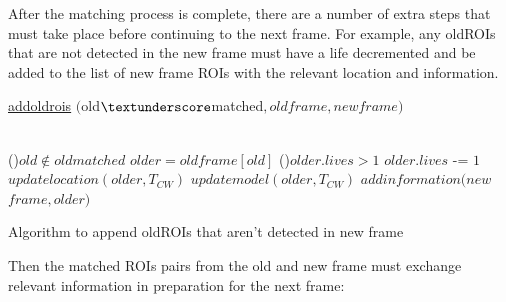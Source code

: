 \documentclass[11pt,twoside]{report}
\begin{document}
After the matching process is complete, there are a number of extra steps that must take place before continuing to the next frame. For example, any oldROIs that are not detected in the new frame must have a life decremented and be added to the list of new frame ROIs with the relevant location and information.

\begin{algorithm}
	\DontPrintSemicolon
	\SetAlgoLined
	\underline{add\textunderscore old\textunderscore rois} $($old$\textunderscore$matched$,old$\textunderscore$frame,new$\textunderscore$frame)$\;
	
	\texttt{\\}
	\ForEach(){$old \notin old$\textunderscore$matched$}{
		$older = old$\textunderscore$frame[old]$ 
		\uIf(){$older.lives > 1$}{
			$older.lives$ -= $1$ 
			$update$\textunderscore$location(older,T_{CW})$  
			$update$\textunderscore$model(older,T_{CW})$  
			$add$\textunderscore$information(new$\textunderscore$frame,older)$  
		}
	}
	\texttt{\\}
	\caption{Algorithm to append oldROIs that aren't detected in new frame}
	\label{alg:weights}
\end{algorithm}

Then the matched ROIs pairs from the old and new frame must exchange relevant information in preparation for the next frame:
\end{document}
